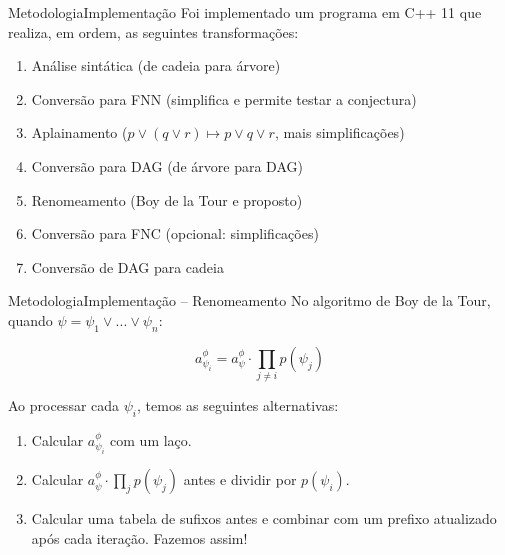 \begin{frame}{Metodologia}{Implementação}
	Foi implementado um programa em C++ 11 que realiza, em ordem, as seguintes transformações:
	\begin{enumerate}
		\pause\item Análise sintática \pause (de cadeia para árvore)
		\pause\item Conversão para FNN \pause (simplifica \pause e permite testar a conjectura)
		\pause\item Aplainamento \pause ($p \vee (q \vee r) \longmapsto p \vee q \vee r$\pause, mais simplificações)
		\pause\item Conversão para DAG \pause (de árvore para DAG)
		\pause\item Renomeamento \pause (Boy de la Tour e proposto)
		\pause\item Conversão para FNC \pause (opcional: simplificações)
		\pause\item Conversão de DAG para cadeia
	\end{enumerate}
\end{frame}

\begin{frame}{Metodologia}{Implementação -- Renomeamento}
	No algoritmo de Boy de la Tour, quando $\psi = \psi_1 \vee ... \vee \psi_n$:
	
	\pause $$a_{\psi_i}^\phi = a_\psi^\phi \cdot \prod_{j \neq i} p(\psi_j)$$
	
	\pause Ao processar cada $\psi_i$, temos as seguintes alternativas:
	\begin{enumerate}
		\pause\item Calcular $a_{\psi_i}^\phi$ com um laço.
		\pause\item Calcular $a_\psi^\phi \cdot \prod_{j} p(\psi_j)$ antes e dividir por $p(\psi_i)$.
		\pause\item Calcular uma tabela de sufixos antes e combinar com um prefixo atualizado após cada iteração. \pause Fazemos assim!
	\end{enumerate}
\end{frame}

